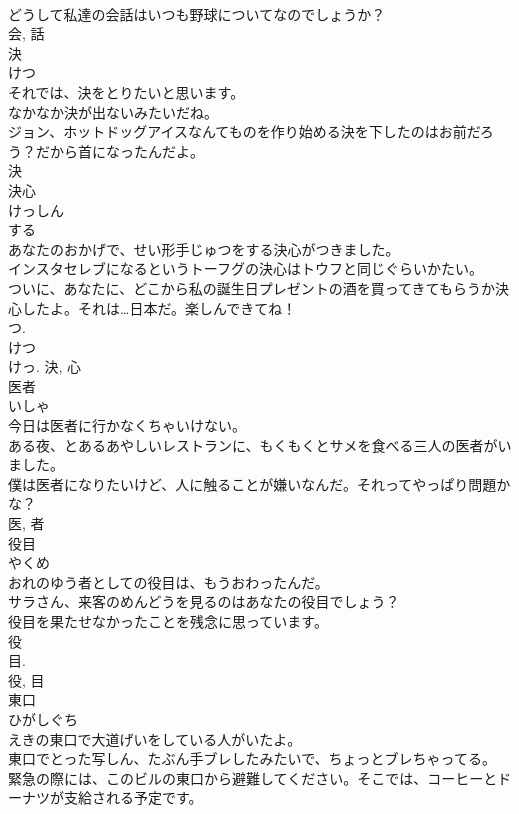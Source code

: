 \documentclass[8pt]{extreport}
\begin{document}
\begin{CJK}{UTF8}{min}
\\	どうして私達の会話はいつも野球についてなのでしょうか？	
\\	会, 話	
\\	決	
\\	けつ	
\\	それでは、決をとりたいと思います。	
\\	なかなか決が出ないみたいだね。	
\\	ジョン、ホットドッグアイスなんてものを作り始める決を下したのはお前だろう？だから首になったんだよ。	
\\	決	
\\	決心	
\\	けっしん	
\\	する 
\\	あなたのおかげで、せい形手じゅつをする決心がつきました。	
\\	インスタセレブになるというトーフグの決心はトウフと同じぐらいかたい。	
\\	ついに、あなたに、どこから私の誕生日プレゼントの酒を買ってきてもらうか決心したよ。それは…日本だ。楽しんできてね！	
\\	つ. 
\\	けつ 
\\	けっ.	決, 心	
\\	医者	
\\	いしゃ	
\\	今日は医者に行かなくちゃいけない。	
\\	ある夜、とあるあやしいレストランに、もくもくとサメを食べる三人の医者がいました。	
\\	僕は医者になりたいけど、人に触ることが嫌いなんだ。それってやっぱり問題かな？	
\\	医, 者	
\\	役目	
\\	やくめ	
\\	おれのゆう者としての役目は、もうおわったんだ。	
\\	サラさん、来客のめんどうを見るのはあなたの役目でしょう？	
\\	役目を果たせなかったことを残念に思っています。	
\\	役 
\\	目. 
\\	役, 目	
\\	東口	
\\	ひがしぐち	
\\	えきの東口で大道げいをしている人がいたよ。	
\\	東口でとった写しん、たぶん手ブレしたみたいで、ちょっとブレちゃってる。	
\\	緊急の際には、このビルの東口から避難してください。そこでは、コーヒーとドーナツが支給される予定です。	

\end{CJK}
\end{document}
